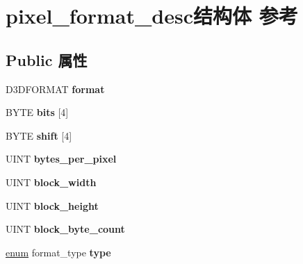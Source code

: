 \hypertarget{structpixel__format__desc}{}\section{pixel\+\_\+format\+\_\+desc结构体 参考}
\label{structpixel__format__desc}
\subsection*{Public 属性}
\begin{DoxyCompactItemize}
\item 
\mbox{\label{structpixel__format__desc_a6d8724bb9d28d0f7c96763ba9e1168ca}} 
D3\+D\+F\+O\+R\+M\+AT {\bfseries format}
\item 
\mbox{\label{structpixel__format__desc_ae1b48a46752efae4dedb426bde63b032}} 
B\+Y\+TE {\bfseries bits} \mbox{[}4\mbox{]}
\item 
\mbox{\label{structpixel__format__desc_a198a33cda149c3bfcee7d0dc0e282f2c}} 
B\+Y\+TE {\bfseries shift} \mbox{[}4\mbox{]}
\item 
\mbox{\label{structpixel__format__desc_a8cdfcfa22b571feff80d852e354da6f4}} 
U\+I\+NT {\bfseries bytes\+\_\+per\+\_\+pixel}
\item 
\mbox{\label{structpixel__format__desc_a8e3bc2aa36b32092645be35c2c5e56d1}} 
U\+I\+NT {\bfseries block\+\_\+width}
\item 
\mbox{\label{structpixel__format__desc_adc9ac6cd97c0c19e9524e90fcbcfcd2a}} 
U\+I\+NT {\bfseries block\+\_\+height}
\item 
\mbox{\label{structpixel__format__desc_ae29ed9ae4ea85687022fac506b7115af}} 
U\+I\+NT {\bfseries block\+\_\+byte\+\_\+count}
\item 
\mbox{\label{structpixel__format__desc_acae84c86639939cb948f4f865513be78}} 
\hyperlink{interfaceenum}{enum} format\+\_\+type {\bfseries type}
\item 
\mbox{\label{structpixel__format__desc_a0bffdfad6ec965b9259f949238304267}} 

\end{DoxyCompactItemize}
